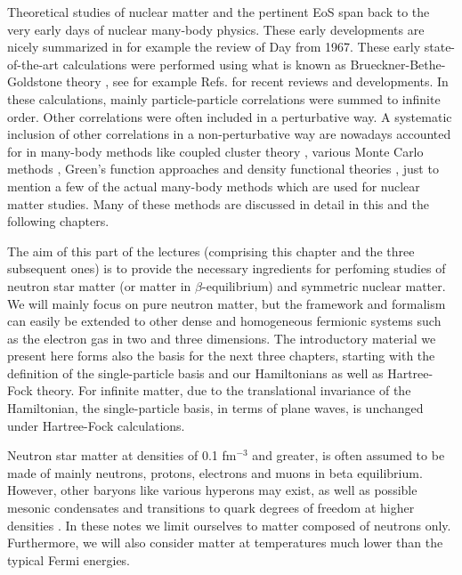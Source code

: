 Theoretical studies of nuclear matter and the pertinent EoS span back
to the very early days of nuclear many-body physics. These early
developments are nicely summarized in for example the review of Day
\cite{day1967} from 1967. These early state-of-the-art calculations
were performed using what is known as Brueckner-Bethe-Goldstone theory
\cite{brueckner1954,brueckner1955}, see for example
Refs.\cite{hh2000,baldo2012,baldo2012a} for recent reviews and
developments.  In these calculations, mainly particle-particle
correlations were summed to infinite order.  Other correlations were
often included in a perturbative way. A systematic inclusion of other
correlations in a non-perturbative way are nowadays accounted for in
many-body methods like coupled cluster theory
\cite{bartlett2007,shavittbartlett2009}, various Monte Carlo methods
\cite{gandolfi2009,lovato2012}, Green's function approaches
\cite{baldo2012a,carbone2013,dickhoff2004} and density functional
theories \cite{erler2013}, just to mention a few of the actual
many-body methods which are used for nuclear matter studies. Many of these methods
are discussed in detail in this and the following chapters.


The aim of this part of the lectures (comprising this chapter and the
three subsequent ones) is to provide the necessary ingredients for
perfoming studies of neutron star matter (or matter in
$\beta$-equilibrium) and symmetric nuclear matter.  We will mainly
focus on pure neutron matter, but the framework and formalism can
easily be extended to other dense and homogeneous fermionic systems
such as the electron gas in two and three dimensions. The introductory
material we present here forms also the basis for the next three
chapters, starting with the definition of the single-particle basis
and our Hamiltonians as well as Hartree-Fock theory. For infinite
matter, due to the translational invariance of the Hamiltonian, the
single-particle basis, in terms of plane waves, is unchanged under
Hartree-Fock calculations.

Neutron star matter at densities of 0.1 fm$^{-3}$ and greater, is
often assumed to be made of mainly neutrons, protons, electrons and
muons in beta equilibrium. However, other baryons like various
hyperons may exist, as well as possible mesonic condensates and
transitions to quark degrees of freedom at higher densities
\cite{hh2000,prakash1996,steiner2010}.  In these notes we limit ourselves to matter composed
of neutrons only.  Furthermore, we will also consider matter at
temperatures much lower than the typical Fermi energies.

